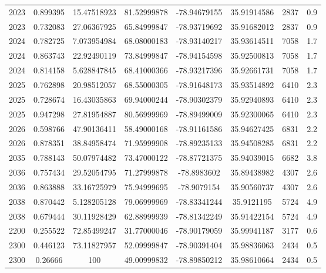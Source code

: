 \documentclass[11pt]{article}
\begin{document}
\begin{longtable*}{|c|c|c|c|c|c|c|c|}
2023  & 0.899395       & 15.47518923       & 81.52999878    & -78.94679155 & 35.91914586 & 2837       & 0.9  \\
2023  & 0.732083       & 27.06367925       & 65.84999847    & -78.93719692 & 35.91682012 & 2837       & 0.9  \\
2024  & 0.782725       & 7.073954984       & 68.08000183    & -78.93140217 & 35.93614511 & 7058       & 1.7  \\
2024  & 0.863743       & 22.92490119       & 73.84999847    & -78.94154598 & 35.92500813 & 7058       & 1.7  \\
2024  & 0.814158       & 5.628847845       & 68.41000366    & -78.93217396 & 35.92661731 & 7058       & 1.7  \\
2025  & 0.762898       & 20.98512057       & 68.55000305    & -78.91648173 & 35.93514892 & 6410       & 2.3  \\
2025  & 0.728674       & 16.43035863       & 69.94000244    & -78.90302379 & 35.92940893 & 6410       & 2.3  \\
2025  & 0.947298       & 27.81954887       & 80.56999969    & -78.89499009 & 35.92300065 & 6410       & 2.3  \\
2026  & 0.598766       & 47.90136411       & 58.49000168    & -78.91161586 & 35.94627425 & 6831       & 2.2  \\
2026  & 0.878351       & 38.84958474       & 71.95999908    & -78.89235133 & 35.94508285 & 6831       & 2.2  \\
2035  & 0.788143       & 50.07974482       & 73.47000122    & -78.87721375 & 35.94039015 & 6682       & 3.8  \\
2036  & 0.757434       & 29.52054795       & 71.27999878    & -78.8983602  & 35.89438982 & 4307       & 2.6  \\
2036  & 0.863888       & 33.16725979       & 75.94999695    & -78.9079154  & 35.90560737 & 4307       & 2.6  \\
2038  & 0.870442       & 5.128205128       & 79.06999969    & -78.83341244 & 35.9121195  & 5724       & 4.9  \\
2038  & 0.679444       & 30.11928429       & 62.88999939    & -78.81342249 & 35.91422154 & 5724       & 4.9  \\
2200  & 0.255522       & 72.85499247       & 31.77000046    & -78.90179059 & 35.99941187 & 3177       & 0.6  \\
2300  & 0.446123       & 73.11827957       & 52.09999847    & -78.90391404 & 35.98836063 & 2434       & 0.5  \\
2300  & 0.26666        & 100               & 49.00999832    & -78.89850212 & 35.98610664 & 2434       & 0.5  \\

\end{longtable*}
\end{document}
